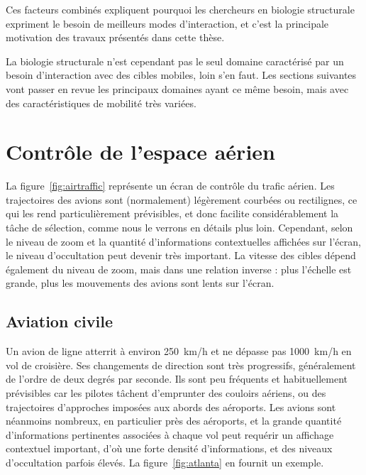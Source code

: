 	Ces facteurs combinés expliquent pourquoi les chercheurs en biologie structurale expriment le besoin de meilleurs modes d'interaction, et c'est la principale motivation des travaux présentés dans cette thèse.
	
	La biologie structurale n'est cependant pas le seul domaine caractérisé par un besoin d'interaction avec des cibles mobiles, loin s'en faut. Les sections suivantes vont passer en revue les principaux domaines ayant ce même besoin, mais avec des caractéristiques de mobilité très variées.
	
	
	\section{Contrôle de l'espace aérien}
 La figure~\ref{fig:airtraffic} représente un écran de contrôle du trafic aérien. Les trajectoires des avions sont (normalement) légèrement courbées ou rectilignes, ce qui les rend particulièrement prévisibles, et donc facilite considérablement la tâche de sélection, comme nous le verrons en détails plus loin. Cependant, selon le niveau de zoom et la quantité d'informations contextuelles affichées sur l'écran, le niveau d'occultation peut devenir très important. La vitesse des cibles dépend également du niveau de zoom, mais dans une relation inverse : plus l'échelle est grande, plus les mouvements des avions sont lents sur l'écran.
	
	\FloatBarrier \subsection{Aviation civile}
	Un avion de ligne atterrit à environ 250~km/h et ne dépasse pas 1000~km/h en vol de croisière. Ses changements de direction sont très progressifs, généralement de l'ordre de deux degrés par seconde. Ils sont peu fréquents et habituellement prévisibles car les pilotes tâchent d'emprunter des couloirs aériens, ou des trajectoires d'approches imposées aux abords des aéroports. Les avions sont néanmoins nombreux, en particulier près des aéroports, et la grande quantité d'informations pertinentes associées à chaque vol peut requérir un affichage contextuel important, d'où une forte densité d'informations, et des niveaux d'occultation parfois élevés. La figure~\ref{fig:atlanta} en fournit un exemple.
	
